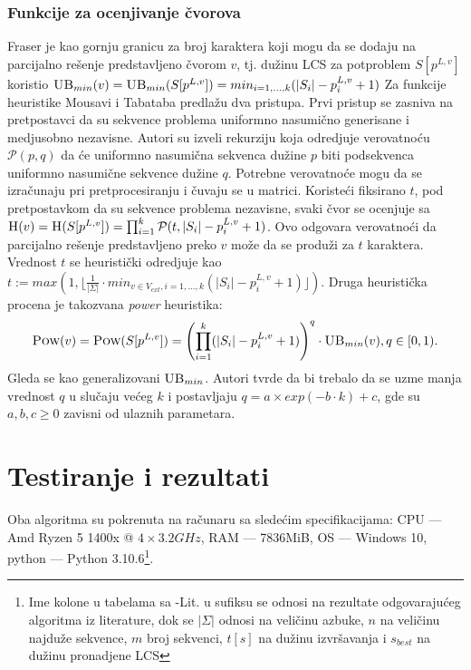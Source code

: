 \documentclass{article}
\begin{document}
    \subsubsection{Funkcije za ocenjivanje čvorova}
    Fraser \cite{fr} je kao gornju granicu za broj karaktera koji mogu da se dodaju na parcijalno rešenje predstavljeno čvorom $v$, tj. dužinu LCS za potproblem $S[p^{L,v}]$ koristio $\textsc{UB}_{min}(v) = \textsc{UB}_{min}(S[p^{L,v}]) = min_{i={1,...,k}}(|S_i|-p_i^{L,v}+1)$ \newline
    \indent Za funkcije heuristike Mousavi i Tabataba \cite{mt, mt2} predlažu dva pristupa. Prvi pristup se zasniva na pretpostavci da su sekvence problema uniformno nasumično generisane i medjusobno nezavisne. Autori su izveli rekurziju koja odredjuje verovatnoću $\mathcal{P}(p, q)$ da će uniformno nasumična sekvenca dužine $p$ biti podsekvenca uniformno nasumične sekvence dužine $q$. Potrebne verovatnoće mogu da se izračunaju pri pretprocesiranju i čuvaju se u matrici. Koristeći fiksirano $t$, pod pretpostavkom da su sekvence problema nezavisne, svaki čvor se ocenjuje sa $\textsc{H}(v) = \textsc{H}(S[p^{L,v}]) = \prod_{i=1}^k\mathcal{P}(t, |S_i|-p_i^{L,v}+1)$. Ovo odgovara verovatnoći da parcijalno rešenje predstavljeno preko $v$ može da se produži za $t$ karaktera. Vrednost $t$ se heuristički odredjuje kao $t := max(1, \lfloor \frac{1}{|\Sigma|} \cdot min_{v \in V_{ext},i={1,...,k}}(|S_i|-p_i^{L,v}+1) \rfloor)$. Druga heuristička procena je takozvana \emph{power} heuristika:
    $$ \textsc{Pow}(v) = \textsc{Pow}(S[p^{L,v}]) = \left(\prod_{i=1}^k(|S_i|-p_i^{L,v}+1)\right)^q\cdot \textsc{UB}_{min}(v), q \in [0,1).$$
    Gleda se kao generalizovani $\textsc{UB}_{min}$. Autori tvrde da bi trebalo da se uzme manja vrednost $q$ u slučaju većeg $k$ i postavljaju $q = a \times exp (-b\cdot k) + c$, gde su $a, b, c \geq 0$ zavisni od ulaznih parametara.


    \section{Testiranje i rezultati}
    Oba algoritma su pokrenuta na računaru sa sledećim specifikacijama: CPU --- Amd Ryzen 5 1400x @ $4 \times 3.2GHz$, RAM --- 7836MiB,  OS --- Windows 10, python --- Python 3.10.6\footnote{Ime kolone u tabelama sa -Lit. u sufiksu se odnosi na rezultate odgovarajućeg algoritma iz literature, dok se $|\Sigma|$ odnosi na veličinu azbuke, $n$ na veličinu najduže sekvence, $m$ broj sekvenci, $t[s]$ na dužinu izvršavanja i $s_{best}$ na dužinu pronadjene LCS}.
\end{document}
